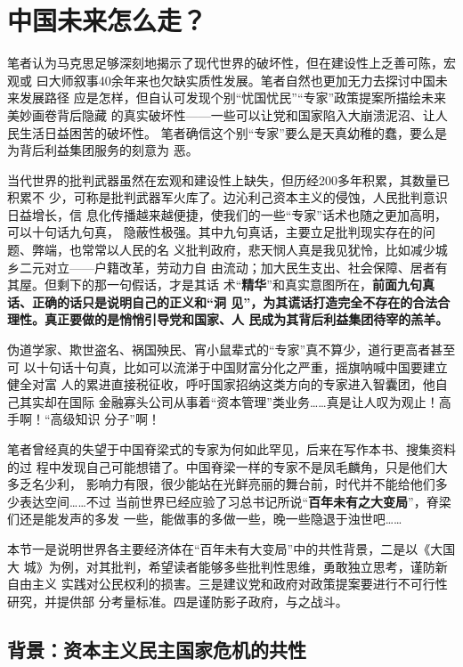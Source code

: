 \chapter{中国未来怎么走？}
\label{chap:future}

笔者认为马克思足够深刻地揭示了现代世界的破坏性，但在建设性上乏善可陈，宏观或
曰大师叙事40余年来也欠缺实质性发展。笔者自然也更加无力去探讨中国未来发展路径
应是怎样，但自认可发现个别“忧国忧民”“专家”政策提案所描绘未来美妙画卷背后隐藏
的真实破坏性——一些可以让党和国家陷入大崩溃泥沼、让人民生活日益困苦的破坏性。
笔者确信这个别“专家”要么是天真幼稚的蠢，要么是为背后利益集团服务的刻意为
恶。

当代世界的批判武器虽然在宏观和建设性上缺失，但历经200多年积累，其数量已积累不
少，可称是批判武器军火库了。边沁利己资本主义的侵蚀，人民批判意识日益增长，信
息化传播越来越便捷，使我们的一些“专家”话术也随之更加高明，可以十句话九句真，
隐蔽性极强。其中九句真话，主要立足批判现实存在的问题、弊端，也常常以人民的名
义批判政府，悲天悯人真是我见犹怜，比如减少城乡二元对立——户籍改革，劳动力自
由流动；加大民生支出、社会保障、居者有其屋。但剩下的那一句假话，才是其话
术“\textbf{精华}”和真实意图所在，\textbf{前面九句真话、正确的话只是说明自己的正义和“洞
  见”，为其谎话打造完全不存在的合法合理性。真正要做的是悄悄引导党和国家、人
  民成为其背后利益集团待宰的羔羊。}

伪道学家、欺世盗名、祸国殃民、宵小鼠辈式的“专家”真不算少，道行更高者甚至可
以十句话十句真，比如可以流涕于中国财富分化之严重，摇旗呐喊中国要建立健全对富
人的累进直接税征收，呼吁国家招纳这类方向的专家进入智囊团，他自己其实却在国际
金融寡头公司从事着“资本管理”类业务……真是让人叹为观止！高手啊！“高级知识
分子”啊！

笔者曾经真的失望于中国脊梁式的专家为何如此罕见，后来在写作本书、搜集资料的过
程中发现自己可能想错了。中国脊梁一样的专家不是凤毛麟角，只是他们大多乏名少利，
影响力有限，很少能站在光鲜亮丽的舞台前，时代并不能给他们多少表达空间……不过
当前世界已经应验了习总书记所说“\textbf{百年未有之大变局}”，脊梁们还是能发声的多发
一些，能做事的多做一些，晚一些隐退于浊世吧……

本节一是说明世界各主要经济体在“百年未有大变局”中的共性背景，二是以《大国大
城》为例，对其批判，希望读者能够多些批判性思维，勇敢独立思考，谨防新自由主义
实践对公民权利的损害。三是建议党和政府对政策提案要进行不可行性研究，并提供部
分考量标准。四是谨防影子政府，与之战斗。


\section{背景：资本主义民主国家危机的共性}

